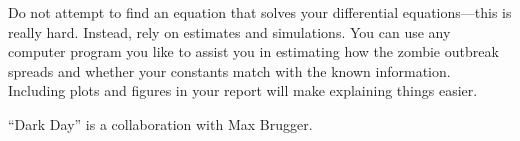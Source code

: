Do not attempt to find an equation that solves your differential equations---this is really hard.
Instead, rely on estimates and simulations.  You can use any computer program you like to assist you in estimating how the zombie outbreak spreads and whether your constants match with the known information.  Including plots and figures in your report will make explaining things easier.



\vfill

\hfill ``Dark Day'' is a collaboration with Max Brugger.

\begin{noexercises}
\end{noexercises}